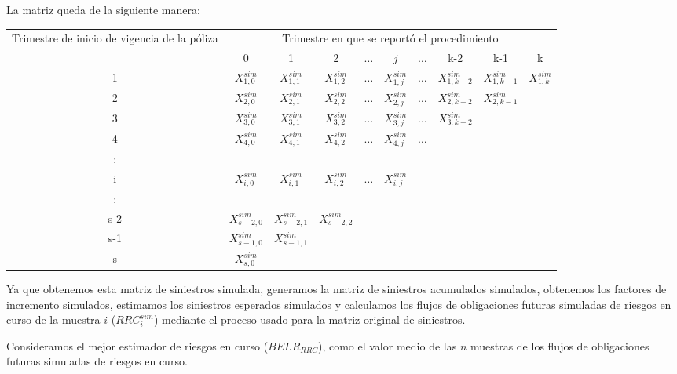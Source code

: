 \documentclass[11pt,twoside,openright,spanish]{report}
\numberwithin{equation}{chapter}
\numberwithin{figure}{chapter}
\numberwithin{table}{chapter}
\begin{document}
	La matriz queda de la siguiente manera:
	
	\begin{table}[H]
		\centering
	
		\begin{tabularx}{\linewidth}{ c|ccccccccc}
			\multirow{2}{4cm}{Trimestre de inicio de vigencia de la póliza}& \multicolumn{9}{c}{Trimestre en que se reportó el procedimiento} \\
			& 0  & 1 & 2 & $ \dots $ & $j$ & $\dots $ & k-2 & k-1 &  k \\
			\midrule
			1      &  $X_{1,0}^{sim}$ & $X_{1,1}^{sim}$ & $X_{1,2}^{sim}$ & $ \dots $ & $X_{1,j}^{sim}$ & $ \dots $ & $X_{1,k-2}^{sim}$ & $X_{1,k-1}^{sim}$ & $X_{1,k}^{sim}$ \\
			2      &  $X_{2,0}^{sim}$ & $X_{2,1}^{sim}$ & $X_{2,2}^{sim}$ & $ \dots $ & $X_{2,j}^{sim}$ & $ \dots $ & $X_{2,k-2}^{sim}$ & $X_{2,k-1}^{sim}$ & \\
			3      &  $X_{3,0}^{sim}$ & $X_{3,1}^{sim}$ & $X_{3,2}^{sim}$ & $ \dots $ & $X_{3,j}^{sim}$ & $ \dots $ & $X_{3,k-2}^{sim}$ & & \\
			4      &  $X_{4,0}^{sim}$ & $X_{4,1}^{sim}$ & $X_{4,2}^{sim}$ & $ \dots $ & $X_{4,j}^{sim}$ & $ \dots $ & & & \\
			:      & & & & & & & & &\\
			i      &  $X_{i,0}^{sim}$ & $X_{i,1}^{sim}$ & $X_{i,2}^{sim}$ & $ \dots $ & $X_{i,j}^{sim}$ & & & & \\
			:      & & & & & & & & & \\
			s-2      &  $X_{s-2,0}^{sim}$ & $X_{s-2,1}^{sim}$ & $X_{s-2,2}^{sim}$ & & & & & & \\
			s-1      &  $X_{s-1,0}^{sim}$ & $X_{s-1,1}^{sim}$ & & & & & & & \\
			s      &  $X_{s,0}^{sim}$ & & & & & & & & \\
		\end{tabularx}
	\end{table}

Ya que obtenemos esta matriz de siniestros simulada, generamos la matriz de siniestros acumulados simulados, obtenemos los factores de incremento simulados, estimamos los siniestros esperados simulados y calculamos los flujos de obligaciones futuras simuladas de riesgos en curso de la muestra $i$ ($RRC_{i}^{sim}$) mediante el proceso usado para la matriz original de siniestros.
	
	 
	
	Consideramos el mejor estimador de riesgos en curso ($BELR_{RRC}$), como el valor medio de las $n$ muestras de los flujos de obligaciones futuras simuladas de riesgos en curso.
\end{document}
